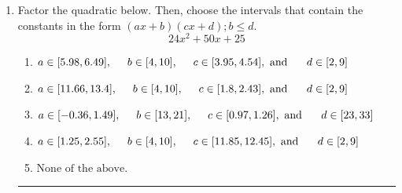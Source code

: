 \documentclass[14pt]{extbook}
\newcommand{\litem}[1]{\item#1\hspace*{-1cm}\rule{\textwidth}{0.4pt}}
\begin{document}
\begin{enumerate}
{\begin{enumerate}[label=\Alph*.]
\end{enumerate} }
\litem{
Factor the quadratic below. Then, choose the intervals that contain the constants in the form $(ax+b)(cx+d); b \leq d.$\[ 24x^{2} +50 x + 25 \]\begin{enumerate}[label=\Alph*.]
\item \( a \in [5.98, 6.49], \hspace*{5mm} b \in [4, 10], \hspace*{5mm} c \in [3.95, 4.54], \text{ and } \hspace*{5mm} d \in [2, 9] \)
\item \( a \in [11.66, 13.4], \hspace*{5mm} b \in [4, 10], \hspace*{5mm} c \in [1.8, 2.43], \text{ and } \hspace*{5mm} d \in [2, 9] \)
\item \( a \in [-0.36, 1.49], \hspace*{5mm} b \in [13, 21], \hspace*{5mm} c \in [0.97, 1.26], \text{ and } \hspace*{5mm} d \in [23, 33] \)
\item \( a \in [1.25, 2.55], \hspace*{5mm} b \in [4, 10], \hspace*{5mm} c \in [11.85, 12.45], \text{ and } \hspace*{5mm} d \in [2, 9] \)
\item \( \text{None of the above.} \)


\end{enumerate}}
\end{enumerate}
\end{document}
